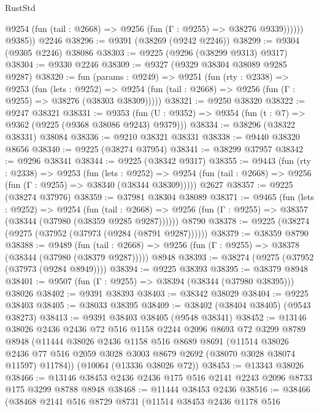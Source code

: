 \begin{lexlean}{RustStd}
\begin{coremodule}
              @9254 (fun (tail : @2668) => @9256 (fun (Γ : @9255) => @38276 @9339))))))
        @9385))
    @2246
@38296 := @9391 (@38269 (@9242 @2246))
@38299 := @9304 (@9305 @2246) @38086
@38303 := @9225 (@9296 (@38299 @9313) @9317)
@38304 := @9330 @2246
@38309 := @9327 (@9329 @38304 @38089 @9285 @9287)
@38320 := fun (params : @9249) =>
  @9251
    (fun (rty : @2338) =>
    @9253
      (fun (lets : @9252) =>
      @9254 (fun (tail : @2668) => @9256 (fun (Γ : @9255) => @38276 (@38303 @38309)))))
@38321 := @9250 @38320
@38322 := @9247 @38321
@38331 := @9353
    (fun (U : @9352) => @9354 (fun (t : @7) => @9362 (@9225 (@9368 @38086 @9243) @9379)))
@38334 := @38296 (@38322 @38331) @38084
@38336 := @9210 @38321 @38331
@38338 := @9440 @38320 @8656
@38340 := @9225 (@38274 @37954)
@38341 := @38299 @37957
@38342 := @9296 @38341
@38344 := @9225 (@38342 @9317)
@38355 := @9443
    (fun (rty : @2338) =>
    @9253
      (fun (lets : @9252) =>
      @9254 (fun (tail : @2668) => @9256 (fun (Γ : @9255) => @38340 (@38344 @38309)))))
    @2627
@38357 := @9225 (@38274 @37976)
@38359 := @37981 @38304 @38089
@38371 := @9465
    (fun (lets : @9252) =>
    @9254
      (fun (tail : @2668) =>
      @9256 (fun (Γ : @9255) => @38357 (@38344 (@37980 (@38359 @9285 @9287))))))
    @8790
@38378 := @9225 (@38274 (@9275 (@37952 (@37973 (@9284 (@8791 @9287))))))
@38379 := @38359 @8790
@38388 := @9489
    (fun (tail : @2668) => @9256 (fun (Γ : @9255) => @38378 (@38344 (@37980 (@38379 @9287)))))
    @8948
@38393 := @38274 (@9275 (@37952 (@37973 (@9284 @8949))))
@38394 := @9225 @38393
@38395 := @38379 @8948
@38401 := @9507 (fun (Γ : @9255) => @38394 (@38344 (@37980 @38395))) @38026
@38402 := @9391 @38393
@38403 := @38342 @38029
@38404 := @9225 @38403
@38405 := @38033 @38395
@38409 := @38402 (@38404 @38405) (@9543 @38273)
@38413 := @9391 @38403 @38405 (@9548 @38341)
@38452 := @13146
    @38026
    @2436
    @2436
    @72
    @516
    @1158
    @2244
    @2096
    @8693
    @72
    @3299
    @8789
    @8948
    (@11444
      @38026
      @2436
      @1158
      @516
      @8689
      @8691
      (@11514
        @38026
        @2436
        @77
        @516
        @2059
        @3028
        @3003
        @8679
        @2692
        (@38070 @3028 @38074 @11597)
        @11784))
    (@10064 (@13336 @38026 @72))
@38453 := @13343 @38026
@38466 := @13146 @38453 @2436 @2436 @175 @516 @2141 @2243 @2096 @8733 @175 @3299 @8788 @8948
@38468 := @11444 @38453 @2436
@38516 := @38466
    (@38468
      @2141
      @516
      @8729
      @8731
      (@11514
        @38453
        @2436
        @1178
        @516

\end{coremodule}
\end{lexlean}
